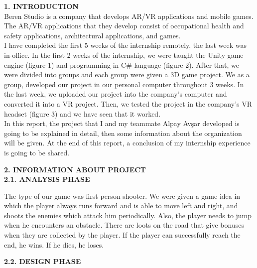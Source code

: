 \documentclass[a4paper]{article}
\begin{document}
\noindent
\textbf{1. INTRODUCTION}\vspace{0.5cm}\\
\indent Beren Studio is a company that develops AR/VR applications and mobile games. The AR/VR applications that they develop consist of occupational health and safety applications, architectural applications, and games.\\
\indent I have completed the first 5 weeks of the internship remotely, the last week was in-office. In the first 2 weeks of the internship, we were taught the Unity game engine (figure 1) and programming in C\# language (figure 2). After that, we were divided into groups and each group were given a 3D game project. We as a group, developed our project in our personal computer throughout 3 weeks. In the last week, we uploaded our project into the company's computer and converted it into a VR project. Then, we tested the project in the company's VR headset (figure 3) and we have seen that it worked.\\
\indent In this report, the project that I and my teammate Alpay Avşar developed is going to be explained in detail, then some information about the organization will be given. At the end of this report, a conclusion of my internship experience is going to be shared. \vspace{1cm}

\noindent
\textbf{2. INFORMATION ABOUT PROJECT}\vspace{0.5cm}\\
\indent \textbf{2.1. ANALYSIS PHASE}\\

\begin{minipage}{\dimexpr\textwidth-1cm}
\hspace{0.5cm} The type of our game was first person shooter. We were given a game idea in which the player always runs forward and is able to move left and right, and shoots the enemies which attack him periodically. Also, the player needs to jump when he encounters an obstacle. There are loots on the road that give bonuses when they are collected by the player. If the player can successfully reach the end, he wins. If he dies, he loses. 
\end{minipage} \vspace{0.5cm}

\indent \textbf{2.2. DESIGN PHASE}\\
\end{document}
